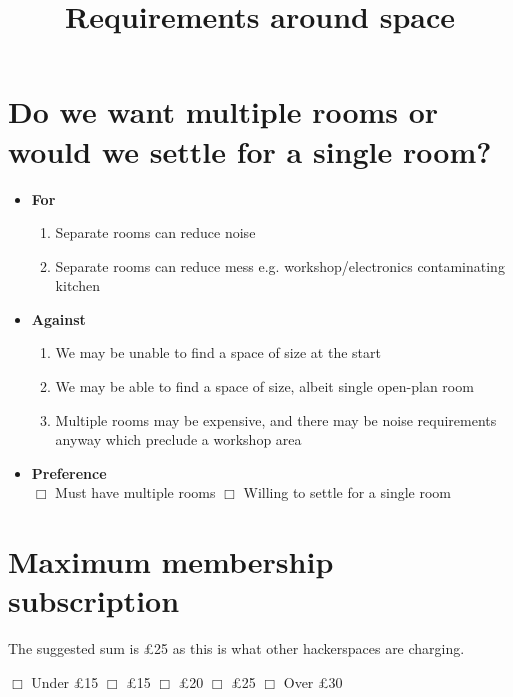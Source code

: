 \documentclass[17pt]{extreport}
\title{Requirements around space}
\date{}
\begin{document}
\thispagestyle{empty}

\section*{Do we want multiple rooms or would we settle for a single room?}
\begin{itemize}

\item\textbf{For}
  \begin{enumerate}
    \item Separate rooms can reduce noise
    \item Separate rooms can reduce mess e.g. workshop/electronics contaminating kitchen
  \end{enumerate}
\item\textbf{Against}
  \begin{enumerate}
    \item We may be unable to find a space of size at the start
    \item We may be able to find a space of size, albeit single open-plan room
    \item Multiple rooms may be expensive, and there may be noise requirements anyway which preclude a workshop area
  \end{enumerate}
\item\textbf{Preference}\\$\Box$ Must have multiple rooms $\Box$ Willing to settle for a single room
\end{itemize}

\section*{Maximum membership subscription}
The suggested sum is \pounds{25} as this is what other hackerspaces are charging.

$\Box$ Under \pounds{15} $\Box$ \pounds{15} $\Box$ \pounds{20} $\Box$ \pounds{25} $\Box$ Over \pounds{30}
\end{document}
